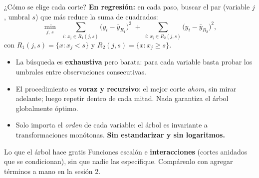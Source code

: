 \documentclass{beamer}
\newcommand{\1}{\mathbb{I}}
\begin{document}
\begin{frame}{¿Cómo se elige cada corte?}
\small
\textbf{En regresión:} en cada paso, buscar el par (variable $j$, umbral $s$) que más reduce la suma de cuadrados:
\[ \min_{j,\,s} \;\; \sum_{i:\, x_i \in R_1(j,s)} \big( y_i - \bar{y}_{R_1} \big)^2 \;+\; \sum_{i:\, x_i \in R_2(j,s)} \big( y_i - \bar{y}_{R_2} \big)^2, \]
con $R_1(j,s) = \{x : x_j < s\}$ y $R_2(j,s) = \{x : x_j \geq s\}$.
\pause
\vspace{0.1cm}
\begin{itemize}\itemsep3pt
  \item La búsqueda es \textbf{exhaustiva} pero barata: para cada variable basta probar los umbrales entre observaciones consecutivas.
  \item El procedimiento es \textbf{voraz y recursivo}: el mejor corte \emph{ahora}, sin mirar adelante; luego repetir dentro de cada mitad. Nada garantiza el árbol globalmente óptimo. \pause
  \item Solo importa el \emph{orden} de cada variable: el árbol es invariante a transformaciones monótonas. \textbf{Sin estandarizar y sin logaritmos.}
\end{itemize}
\pause
\begin{block}{Lo que el árbol hace gratis}
Funciones escalón e \textbf{interacciones} (cortes anidados que se condicionan), sin que nadie las especifique. Compárenlo con agregar términos a mano en la sesión 2.
\end{block}
\end{frame}
\end{document}
